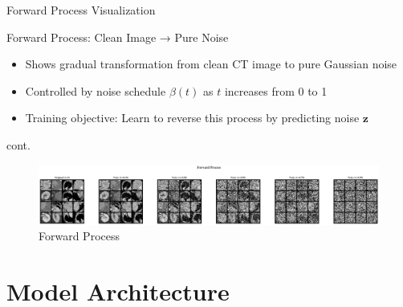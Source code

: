 \documentclass[10pt]{beamer}
\begin{document}
\begin{frame}{Forward Process Visualization}
  \centering
  \begin{alertblock}{Forward Process: Clean Image → Pure Noise}
    \begin{itemize}\itemsep -0.1cm
      \item Shows gradual transformation from clean CT image to pure Gaussian noise
      \item Controlled by noise schedule $\beta(t)$ as $t$ increases from 0 to 1
      \item Training objective: Learn to reverse this process by predicting noise $\mathbf{z}$
    \end{itemize}
  \end{alertblock}
\end{frame}

\begin{frame}{cont.}
  \centering
  \begin{figure}
      \includegraphics[width=\linewidth]{forward_pass.png}
      \caption{Forward Process}
  \end{figure}
\end{frame}

\section{Model Architecture}
\end{document}
